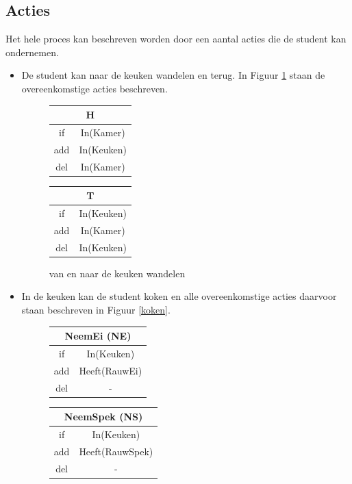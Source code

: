 \documentclass[alternative-exam.tex]{subfiles}
\begin{document}
\subsection{Acties}
Het hele proces kan beschreven worden door een aantal acties die de student kan ondernemen.
\begin{itemize}
\item
De student kan naar de keuken wandelen en terug. In Figuur \ref{keuken} staan de overeenkomstige acties beschreven.
\begin{figure}[H]
\centering
\begin{tabular}{|c|c|}
    \multicolumn{2}{c}{H}\\
    \hline
    if & In(Kamer)\\
    \hline
    add & In(Keuken)\\
    \hline
    del & In(Kamer)\\
    \hline
\end{tabular}
\hspace{0.25cm}
\begin{tabular}{|c|c|}
    \multicolumn{2}{c}{T}\\
    \hline
    if & In(Keuken)\\
    \hline
    add & In(Kamer)\\
    \hline
    del & In(Keuken)\\
    \hline
\end{tabular}
\caption{van en naar de keuken wandelen}
\label{keuken}
\end{figure}
\item 
In de keuken kan de student koken en alle overeenkomstige acties daarvoor staan beschreven in Figuur \ref{koken}.
\begin{figure}[H]
\centering
\begin{tabular}{|c|c|}
    \multicolumn{2}{c}{NeemEi (NE)}\\
    \hline
    if & In(Keuken)\\
    \hline
    add & Heeft(RauwEi)\\
    \hline
    del & -\\
    \hline
\end{tabular}
\hspace{0.25cm}
\begin{tabular}{|c|c|}
    \multicolumn{2}{c}{NeemSpek (NS)}\\
    \hline
    if & In(Keuken)\\
    \hline
    add & Heeft(RauwSpek)\\
    \hline
    del & -\\

\end{tabular}
\end{figure}
\end{itemize}
\end{document}
